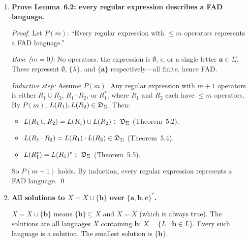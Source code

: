 \begin{enumerate}[{6.}1.]
\begin{enumerate}[(a)]
  Same $X_3=X_1$.  From $X_1=(\pmb{0}\cup\pmb{1})X_2$, substitute into $X_2$:
  $X_2=\epsilon\cup\pmb{0}(\pmb{0}\cup\pmb{1})X_2\cup\pmb{1}X_2=\epsilon\cup(\pmb{0}(\pmb{0}\cup\pmb{1})\cup\pmb{1})X_2$.
  Let $A=\pmb{0}(\pmb{0}\cup\pmb{1})\cup\pmb{1}=\pmb{00}\cup\pmb{01}\cup\pmb{1}$; $\lambda\notin A$.
  $X_2=A^*$.
  Then $X_1=(\pmb{0}\cup\pmb{1})A^*$ and $X_3=X_1$.

  \item \textbf{Comparison:} Both solutions are equivalent: $(\pmb{0}\cup\pmb{1})\pmb{1}^*(\pmb{0}(\pmb{0}\cup\pmb{1})\pmb{1}^*)^*=(\pmb{0}\cup\pmb{1})(\pmb{00}\cup\pmb{01}\cup\pmb{1})^*$.  The second form is more concise.
\end{enumerate}

\item \textbf{Prove Lemma~6.2: every regular expression describes a FAD language.}

\begin{proof}
Let $P(m)$: ``Every regular expression with $\le m$ operators represents a FAD language.''

\emph{Base ($m=0$):}  No operators: the expression is $\emptyset$, $\epsilon$, or a single letter $\pmb{a}\in\Sigma$.  These represent $\emptyset$, $\{\lambda\}$, and $\{\pmb{a}\}$ respectively---all finite, hence FAD.

\emph{Inductive step:}  Assume $P(m)$.  Any regular expression with $m+1$ operators is either $R_1\cup R_2$, $R_1\cdot R_2$, or $R_1^*$, where $R_1$ and $R_2$ each have $\le m$ operators.  By $P(m)$, $L(R_1),L(R_2)\in\mathfrak{D}_\Sigma$.  Then:
\begin{itemize}
  \item $L(R_1\cup R_2)=L(R_1)\cup L(R_2)\in\mathfrak{D}_\Sigma$ (Theorem~5.2).
  \item $L(R_1\cdot R_2)=L(R_1)\cdot L(R_2)\in\mathfrak{D}_\Sigma$ (Theorem~5.4).
  \item $L(R_1^*)=L(R_1)^*\in\mathfrak{D}_\Sigma$ (Theorem~5.5).
\end{itemize}
So $P(m+1)$ holds.  By induction, every regular expression represents a FAD language. \qed
\end{proof}

\item \textbf{All solutions to $X=X\cup\{\pmb{b}\}$ over $\{\pmb{a},\pmb{b},\pmb{c}\}^*$.}

$X=X\cup\{\pmb{b}\}$ means $\{\pmb{b}\}\subseteq X$ and $X=X$ (which is always true).  The solutions are all languages $X$ containing $\pmb{b}$: $X=\{L\mid\pmb{b}\in L\}$.  Every such language is a solution.  The smallest solution is $\{\pmb{b}\}$.


\end{enumerate}
